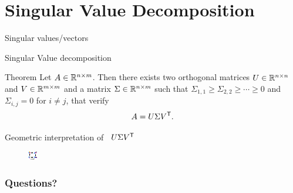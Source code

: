 \documentclass{beamer}
\begin{document}
\section{Singular Value Decomposition}


\begin{frame}[t]{Singular values/vectors}
	\grid


\end{frame}
\begin{frame}[t]{Singular Value decomposition}
	\grid

	\begin{block}{Theorem}
		Let $A \in \mathbb{R}^{n \times m}$. Then there exists two orthogonal matrices $U \in \mathbb{R}^{n \times n}$ and $V \in \mathbb{R}^{m \times m}$ and a matrix $\Sigma \in \mathbb{R}^{n \times m}$ such that $\Sigma_{1,1} \geq \Sigma_{2,2}  \geq \cdots \geq 0$ and $\Sigma_{i,j} = 0$ for $i\neq j$, that verify
		$$
		A = U \Sigma V^{{\sf T}}.
		$$
	\end{block}

\end{frame}

\begin{frame}[t]{Geometric interpretation of \ $U\Sigma V^{{\sf T}}$}
\begin{figure}[H]
	\begin{center}
	\includegraphics[width = 0.6\linewidth]{../figures/svd.pdf}
	\end{center}
\end{figure}

\end{frame}

\appendix
\backupbegin
\begin{frame}[t]
	\frametitle{Questions?}
	\grid

	\pause
\end{frame}
\backupend
\end{document}
